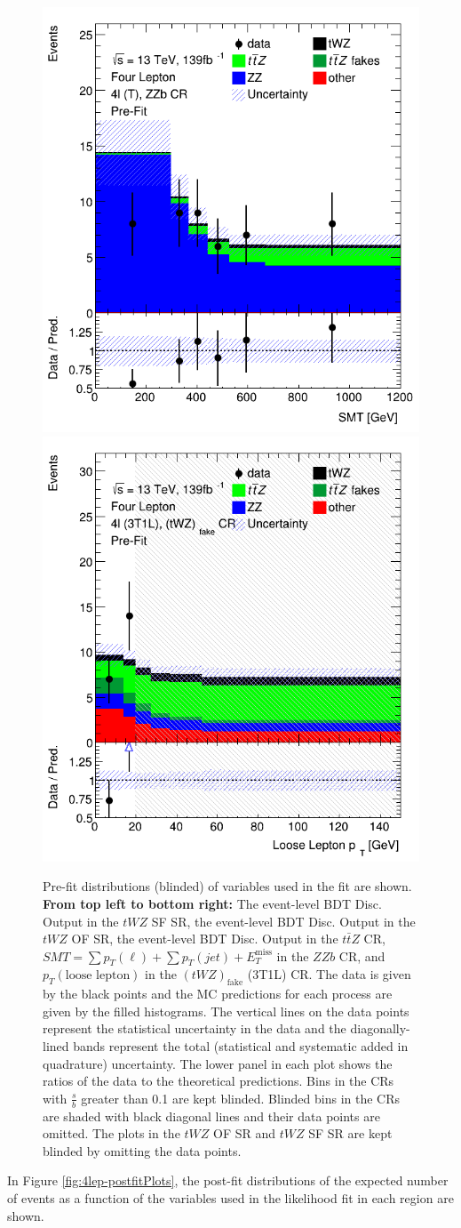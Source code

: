 \begin{figure}[htbp]
    \includegraphics[width=.3\textwidth]{figures/PostFitPlots/lep4_ZZb_4T.png} \quad
     \includegraphics[width=.3\textwidth]{figures/PostFitPlots/lep4_tWZ_3T1L.png}

        \caption{Pre-fit distributions (blinded) of variables used in the fit are shown. \textbf{From top left to bottom right:} The event-level BDT Disc. Output in the $tWZ$ SF SR, the event-level BDT Disc. Output in the $tWZ$ OF SR, the event-level BDT Disc. Output in the $t\bar{t}Z$ CR, $SMT = \sum p_{T} (\ell) + \sum p_{T} (jet) + E_{T}^{\text{miss}}$ in the $ZZb$ CR, and $p_{T}(\text{loose lepton})$ in the $(tWZ)_{\text{fake}}$ (3T1L) CR. The data is given by the black points and the MC predictions for each process are given by the filled histograms. The vertical lines on the data points represent the statistical uncertainty in the data and the diagonally-lined bands represent the total (statistical and systematic added in quadrature) uncertainty. The lower panel in each plot shows the ratios of the data to the theoretical predictions. Bins in the CRs with $\frac{s}{b}$ greater than 0.1 are kept blinded. Blinded bins in the CRs are shaded with black diagonal lines and their data points are omitted. The plots in the $tWZ$ OF SR and $tWZ$ SF SR are kept blinded by omitting the data points.}
  \label{fig:4lep-prefitPlots}
\end{figure}In Figure \ref{fig:4lep-postfitPlots}, the post-fit distributions of the expected number of events as a function of the variables used in the likelihood fit in each region are shown.
